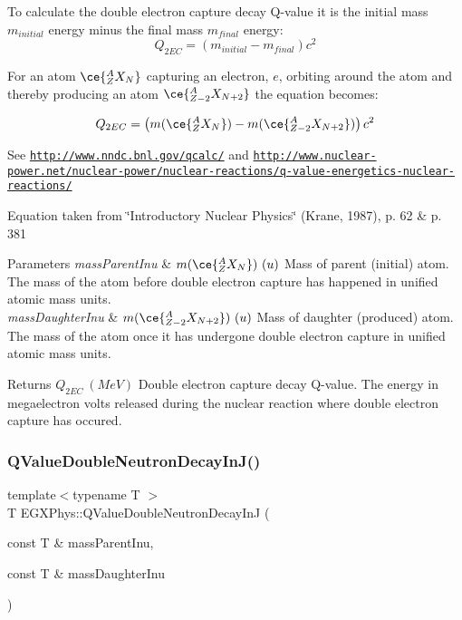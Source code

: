 To calculate the double electron capture decay Q-\/value it is the initial mass $m_{initial}$ energy minus the final mass $m_{final}$ energy\+: \[Q_{2EC} = \left ( m_{initial}-m_{final}\right ) c^2\]

For an atom $\ce{ ^{A}_{Z}X_{N} }$ capturing an electron, $e$, orbiting around the atom and thereby producing an atom $\ce{ ^{A}_{Z-2}X_{N{+2}} }$ the equation becomes\+:

\[Q_{2EC} = \left ( m(\ce{ ^{A}_{Z}X_{N} }) - m(\ce{ ^{A}_{Z-2}X_{N{+2}} }) \right ) c^2\]

See \href{http://www.nndc.bnl.gov/qcalc/}{\tt http\+://www.\+nndc.\+bnl.\+gov/qcalc/} and \href{http://www.nuclear-power.net/nuclear-power/nuclear-reactions/q-value-energetics-nuclear-reactions/}{\tt http\+://www.\+nuclear-\/power.\+net/nuclear-\/power/nuclear-\/reactions/q-\/value-\/energetics-\/nuclear-\/reactions/}

Equation taken from \char`\"{}\+Introductory Nuclear Physics\char`\"{} (Krane, 1987), p. 62 \& p. 381


\begin{DoxyParams}{Parameters}
{\em mass\+Parent\+Inu} & $m(\ce{ ^{A}_{Z}X_{N} })\ (u)$ Mass of parent (initial) atom. The mass of the atom before double electron capture has happened in unified atomic mass units. \\
\hline
{\em mass\+Daughter\+Inu} & $m(\ce{ ^{A}_{Z-2}X_{N{+2}} })\ (u)$ Mass of daughter (produced) atom. The mass of the atom once it has undergone double electron capture in unified atomic mass units. \\
\hline
\end{DoxyParams}
\begin{DoxyReturn}{Returns}
$Q_{2EC}\ (MeV)$ Double electron capture decay Q-\/value. The energy in megaelectron volts released during the nuclear reaction where double electron capture has occured. 
\end{DoxyReturn}
\mbox{\label{group___q_value_gada1ace2aa0a791df382f120767a56fe9}} 
\subsubsection{\texorpdfstring{Q\+Value\+Double\+Neutron\+Decay\+In\+J()}{QValueDoubleNeutronDecayInJ()}}
{\footnotesize\ttfamily template$<$typename T $>$ \\
T E\+G\+X\+Phys\+::\+Q\+Value\+Double\+Neutron\+Decay\+InJ (\begin{DoxyParamCaption}\item[{const T \&}]{mass\+Parent\+Inu,  }\item[{const T \&}]{mass\+Daughter\+Inu }\end{DoxyParamCaption})}



